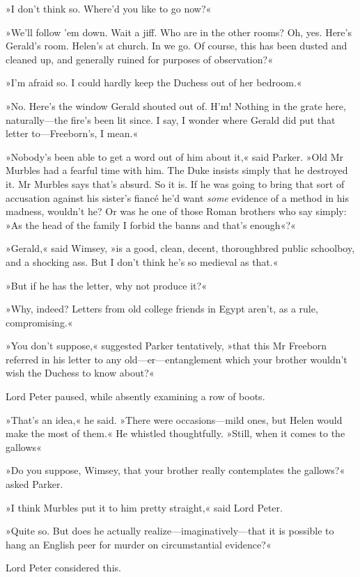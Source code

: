 »I don't think so. Where'd you like to go now?«

»We'll follow 'em down. Wait a jiff. Who are in the other rooms? Oh, yes. Here's Gerald's room. Helen's at church. In we go. Of course, this has been dusted and cleaned up, and generally ruined for purposes of observation?«

»I'm afraid so. I could hardly keep the Duchess out of her bedroom.«

»No. Here's the window Gerald shouted out of. H'm! Nothing in the grate here, naturally—the fire's been lit since. I say, I wonder where Gerald did put that letter to—Freeborn's, I mean.«

»Nobody's been able to get a word out of him about it,« said Parker. »Old Mr Murbles had a fearful time with him. The Duke insists simply that he destroyed it. Mr Murbles says that's absurd. So it is. If he was going to bring that sort of accusation against his sister's fiancé he'd want \textit{some} evidence of a method in his madness, wouldn't he? Or was he one of those Roman brothers who say simply: »As the head of the family I forbid the banns and that's enough«?«

»Gerald,« said Wimsey, »is a good, clean, decent, thoroughbred public schoolboy, and a shocking ass. But I don't think he's so medieval as that.«

»But if he has the letter, why not produce it?«

»Why, indeed? Letters from old college friends in Egypt aren't, as a rule, compromising.«

»You don't suppose,« suggested Parker tentatively, »that this Mr Freeborn referred in his letter to any old—er—entanglement which your brother wouldn't wish the Duchess to know about?«

Lord Peter paused, while absently examining a row of boots.

»That's an idea,« he said. »There were occasions—mild ones, but Helen would make the most of them.« He whistled thoughtfully. »Still, when it comes to the gallows\longdash«

»Do you suppose, Wimsey, that your brother really contemplates the gallows?« asked Parker.

»I think Murbles put it to him pretty straight,« said Lord Peter.

»Quite so. But does he actually realize—imaginatively—that it is possible to hang an English peer for murder on circumstantial evidence?«

Lord Peter considered this.


